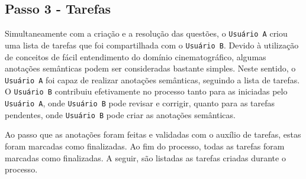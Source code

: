 \begin{tcolorbox}
\begin{enumerate}[label=(Q\arabic*)]
        
    \setlength{\parskip}{0.2cm}
        
    \end{enumerate}
\end{tcolorbox}



\subsection{Passo 3 - Tarefas}\label{estudo-de-caso-passo3-tarefas}

Simultaneamente com a criação e a resolução das questões, o \texttt{Usuário A} criou uma lista de tarefas que foi compartilhada com o \texttt{Usuário B}. Devido à utilização de conceitos de fácil entendimento do domínio cinematográfico, algumas anotações semânticas podem ser consideradas bastante simples. Neste sentido, o \texttt{Usuário A} foi capaz de realizar anotações semânticas, seguindo a lista de tarefas. O \texttt{Usuário B} contribuiu efetivamente no processo tanto para as iniciadas pelo \texttt{Usuário A}, onde \texttt{Usuário B} pode revisar e corrigir, quanto para as tarefas pendentes, onde \texttt{Usuário B} pode criar as anotações semânticas.

Ao passo que as anotações foram feitas e validadas com o auxílio de tarefas, estas foram marcadas como finalizadas. Ao fim do processo, todas as tarefas foram marcadas como finalizadas. A seguir, são listadas as tarefas criadas durante o processo. 

